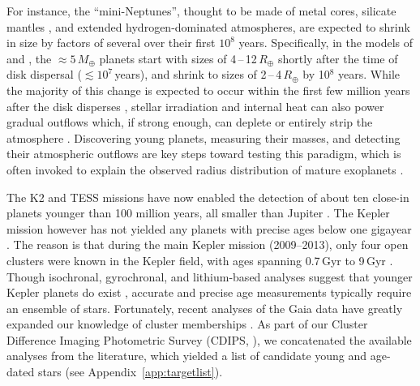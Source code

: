 \documentclass[12pt,modern,twocolumn,tighten,linenumbers,trackchanges]{aastex63}
\begin{document}
For instance, the ``mini-Neptunes'', thought to be made of metal
cores, silicate mantles \citep{kite_atmosphere_2020}, and extended
hydrogen-dominated atmospheres, are expected to shrink
in size by factors of several over their first $10^8$ years.
Specifically, in the models of \citet{owen_atmospheres_2016} and
\citet{owen_constraining_2020}, the $\approx$$5\,M_\oplus$ planets start
with sizes of 4\,--\,12\,$R_\oplus$ shortly after the time of disk
dispersal ($\lesssim$$10^7$\,years), and shrink to sizes of
2\,--\,4\,$R_\oplus$ by 10$^8$ years.  While the majority of this change
is expected to occur within the first few million years after the disk
disperses \citep{ikoma_situ_2012}, stellar
irradiation and internal heat can also power gradual outflows
which, if strong enough, can deplete or entirely strip the atmosphere \citep{lopez_how_2012,Owen_Wu_2013,ginzburg_corepowered_2018}.
Discovering young planets, measuring their masses, and detecting their
atmospheric outflows are key steps toward testing this paradigm, which
is often invoked to explain the observed radius distribution of mature
exoplanets \citep{Fulton_et_al_2017,van_eylen_asteroseismic_2018}.

The K2 and TESS missions have now enabled the detection of about ten
close-in planets younger than 100 million years, all smaller than
Jupiter
\citep{Mann_K2_33b_2016,David_et_al_2017,david_four_2019,newton_tess_2019,bouma_cluster_2020,plavchan_planet_2020,rizzuto_tess_2020,martioli_aumicbc_2021}.
The Kepler mission however has not yielded any planets with precise
ages below one gigayear \citep{Meibom_et_al_2013}.  The reason is that
during the main Kepler mission (2009--2013), only four open clusters
were known in the Kepler field,
with ages spanning 0.7\,Gyr to 9\,Gyr \citep{meibom_kepler_2011}.
Though isochronal, gyrochronal, and lithium-based analyses suggest
that younger Kepler planets do exist
\citep{walkowicz_rotation_2013,berger_identifying_2018,david_sizes_2021}, accurate and precise
age measurements typically require an ensemble of stars.  Fortunately,
recent analyses of the Gaia data have greatly expanded our knowledge
of cluster memberships \citep[{\it
e.g.},][]{CantatGaudin2018a,Zari2018,KounkelCovey2019,Meingast2021,Kerr2021}.
As part of our Cluster Difference Imaging Photometric Survey (CDIPS,
\citealt{bouma_cdipsI_2019}), we concatenated the available analyses
from the literature, which yielded a list of candidate young and
age-dated stars (see Appendix~\ref{app:targetlist}).
\end{document}
